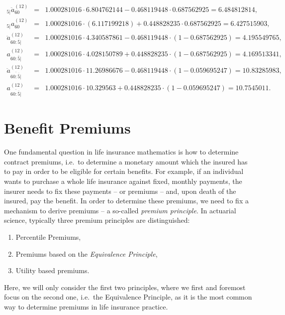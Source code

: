 \documentclass[11pt,fleqn,oneside]{book}
\begin{document}
\begin{enumerate}
\begin{eqnarray*}
{_{5|}\ddot{a}_{60}^{(12)}} &=& 1.000281016\cdot 6.804762144 - 0.468119448\cdot 0.687562925 = 6.484812814,\\
{_{5|}a_{60}^{(12)}} &=& 1.000281016\cdot (6.117199218)+ 0.448828235\cdot 0.687562925 = 6.427515903,\\
{\ddot{a}_{60:\overline{5}|}^{(12)}} &=& 1.000281016\cdot 4.340587861 - 0.468119448\cdot (1 - 0.687562925) = 4.195549765,\\
{a_{60:\overline{5}|}^{(12)}} &=& 1.000281016\cdot 4.028150789 + 0.448828235 \cdot (1 - 0.687562925) = 4.169513341,\\
{\ddot{a}_{\overline{60:\overline{5}|}}^{(12)}} &=& 1.000281016\cdot 11.26986676 - 0.468119448\cdot (1 - 0.059695247) = 10.83285983,\\
{a_{\overline{60:\overline{5}|}}^{(12)}} &=& 1.000281016\cdot 10.329563 + 0.448828235 \cdot (1 - 0.059695247) = 10.7545011.
\end{eqnarray*}
\end{enumerate}
\normalsize

\chapter{Benefit Premiums}
\label{CHAPBENPREM}

One fundamental question in life insurance mathematics is how to determine contract premiums, i.e.\ to determine a monetary amount which the insured has to pay in order to be eligible for certain benefits. For example, if an individual wants to purchase a whole life insurance against fixed, monthly payments, the insurer needs to fix these payments -- or premiums -- and, upon death of the insured, pay the benefit. In order to determine these premiums, we need to fix a mechanism to derive premiums -- a so-called \textit{premium principle}. In actuarial science, typically three premium principles are distinguished:
\begin{enumerate}
\item Percentile Premiums,
\item Premiums based on the \textit{Equivalence Principle},
\item Utility based premiums.
\end{enumerate}
Here, we will only consider the first two principles, where we first and foremost  focus on the second one, i.e.\ the Equivalence Principle, as it is the most common way to determine premiums in life insurance practice.
\end{document}
